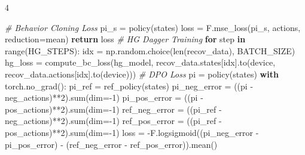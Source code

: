 \documentclass{article}
\newenvironment{Shaded}{\CodeFontSize\setlength{\topsep}{\CodeBlockSkip}\setlength{\partopsep}{0pt}}{}
\newcommand{\BuiltInTok}[1]{\textcolor[rgb]{0.00,0.50,0.00}{#1}}
\newcommand{\CommentTok}[1]{\textcolor[rgb]{0.38,0.63,0.69}{\textit{#1}}}
\newcommand{\ControlFlowTok}[1]{\textcolor[rgb]{0.00,0.44,0.13}{\textbf{#1}}}
\newcommand{\DecValTok}[1]{\textcolor[rgb]{0.25,0.63,0.44}{#1}}
\newcommand{\KeywordTok}[1]{\textcolor[rgb]{0.00,0.44,0.13}{\textbf{#1}}}
\newcommand{\NormalTok}[1]{#1}
\newcommand{\OperatorTok}[1]{\textcolor[rgb]{0.40,0.40,0.40}{#1}}
\newcommand{\StringTok}[1]{\textcolor[rgb]{0.25,0.44,0.63}{#1}}
\newcommand{\CodeFontSize}{\fontsize{3.6}{4}\selectfont}
\newlength{\CodeBlockSkip}
\newcommand{\NumCodeColumns}{4}  %
\begin{document}
\begin{multicols*}{\NumCodeColumns}
\begin{Shaded}
\begin{Highlighting}[]
\CommentTok{\# Behavior Cloning Loss}
\NormalTok{pi\_s }\OperatorTok{=}\NormalTok{ policy(states)}
\NormalTok{loss }\OperatorTok{=}\NormalTok{ F.mse\_loss(pi\_s, actions, reduction}\OperatorTok{=}\StringTok{\textquotesingle{}mean\textquotesingle{}}\NormalTok{)}
\ControlFlowTok{return}\NormalTok{ loss}
\CommentTok{\# HG Dagger Training}
\ControlFlowTok{for}\NormalTok{ step }\KeywordTok{in} \BuiltInTok{range}\NormalTok{(HG\_STEPS):}
\NormalTok{  idx }\OperatorTok{=}\NormalTok{ np.random.choice(}\BuiltInTok{len}\NormalTok{(recov\_data), BATCH\_SIZE)}
\NormalTok{  hg\_loss }\OperatorTok{=}\NormalTok{ compute\_bc\_loss(hg\_model, recov\_data.states[idx].to(device, recov\_data.actions[idx].to(device)))}
\CommentTok{\# DPO Loss}
\NormalTok{pi }\OperatorTok{=}\NormalTok{ policy(states)}
\ControlFlowTok{with}\NormalTok{ torch.no\_grad():}
\NormalTok{  pi\_ref }\OperatorTok{=}\NormalTok{ ref\_policy(states)}
\NormalTok{pi\_neg\_error }\OperatorTok{=}\NormalTok{ ((pi }\OperatorTok{{-}}\NormalTok{ neg\_actions)}\OperatorTok{**}\DecValTok{2}\NormalTok{).}\BuiltInTok{sum}\NormalTok{(dim}\OperatorTok{={-}}\DecValTok{1}\NormalTok{)}
\NormalTok{pi\_pos\_error }\OperatorTok{=}\NormalTok{ ((pi }\OperatorTok{{-}}\NormalTok{ pos\_actions)}\OperatorTok{**}\DecValTok{2}\NormalTok{).}\BuiltInTok{sum}\NormalTok{(dim}\OperatorTok{={-}}\DecValTok{1}\NormalTok{)}
\NormalTok{ref\_neg\_error }\OperatorTok{=}\NormalTok{ ((pi\_ref }\OperatorTok{{-}}\NormalTok{ neg\_actions)}\OperatorTok{**}\DecValTok{2}\NormalTok{).}\BuiltInTok{sum}\NormalTok{(dim}\OperatorTok{={-}}\DecValTok{1}\NormalTok{)}
\NormalTok{ref\_pos\_error }\OperatorTok{=}\NormalTok{ ((pi\_ref }\OperatorTok{{-}}\NormalTok{ pos\_actions)}\OperatorTok{**}\DecValTok{2}\NormalTok{).}\BuiltInTok{sum}\NormalTok{(dim}\OperatorTok{={-}}\DecValTok{1}\NormalTok{)}
\NormalTok{loss }\OperatorTok{=} \OperatorTok{{-}}\NormalTok{F.logsigmoid((pi\_neg\_error }\OperatorTok{{-}}\NormalTok{ pi\_pos\_error) }\OperatorTok{{-}}\NormalTok{ (ref\_neg\_error }\OperatorTok{{-}}\NormalTok{ ref\_pos\_error)).mean()}
\end{Highlighting}
\end{Shaded}

\end{multicols*}
\end{document}
